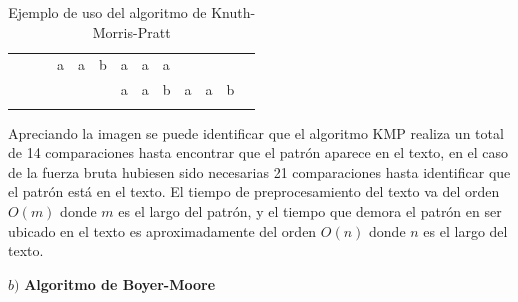 \begin{table}[h]
\begin{tabular}{lllllllllllll}
                        &                        & \multicolumn{1}{l|}{}  & \multicolumn{1}{l|}{a}                         & \multicolumn{1}{l|}{a}                         & \multicolumn{1}{l|}{b} & \multicolumn{1}{l|}{a}                         & \multicolumn{1}{l|}{a}                         & \multicolumn{1}{l|}{\cellcolor[HTML]{FD6864}a} &                                                &                                                &                                                &                        \\ \cline{4-12}
                        &                        &                        &                                                &                                                & \multicolumn{1}{l|}{}  & \multicolumn{1}{l|}{\cellcolor[HTML]{9AFF99}a} & \multicolumn{1}{l|}{\cellcolor[HTML]{9AFF99}a} & \multicolumn{1}{l|}{\cellcolor[HTML]{9AFF99}b} & \multicolumn{1}{l|}{\cellcolor[HTML]{9AFF99}a} & \multicolumn{1}{l|}{\cellcolor[HTML]{9AFF99}a} & \multicolumn{1}{l|}{\cellcolor[HTML]{9AFF99}b} &                        \\ \cline{7-12}
                        &                        &                        &                                                &                                                &                        &                                                &                                                &                                                &                                                &                                                &                                                &                       
\end{tabular}
\caption{Ejemplo de uso del algoritmo de Knuth-Morris-Pratt}
\end{table}

Apreciando la imagen se puede identificar que el algoritmo KMP realiza un total de 14 comparaciones hasta encontrar que el patrón aparece en el texto, en el caso de la fuerza bruta hubiesen sido necesarias 21 comparaciones hasta identificar que el patrón está en el texto.
El tiempo de preprocesamiento del texto va del orden $O(m)$ donde $m$ es el largo del patrón, y el tiempo que demora el patrón en ser ubicado en el texto es aproximadamente del orden $O(n)$ donde $n$ es el largo del texto.

$b)$ \textbf{Algoritmo de Boyer-Moore}

